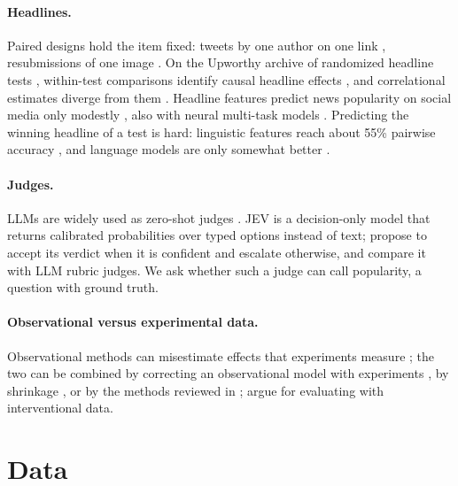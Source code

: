 \documentclass[10pt,a4paper,twocolumn]{article}
\begin{document}
\paragraph{Headlines.} Paired designs hold the item fixed: tweets by one author on one link \citep{tan2014},
resubmissions of one image \citep{lakkaraju2013}. On the Upworthy archive of randomized headline tests
\citep{matias2021}, within-test comparisons identify causal headline effects
\citep{gligoric2023,banerjee2025,robertson2023}, and correlational estimates diverge from them
\citep{banerjee2026}. Headline features predict news popularity on social media only modestly \citep{piotrkowicz2017},
also with neural multi-task models \citep{lamprinidis2018}. Predicting the winning headline of a test is hard:
linguistic features reach about 55\% pairwise
accuracy \citep{gligoric2021}, and language models are only somewhat better \citep{ye2024lola}.
\paragraph{Judges.} LLMs are widely used as zero-shot judges \citep{zheng2023judge}. JEV is a decision-only
model that returns calibrated probabilities over typed options instead of text; \citet{li2026jev} propose to
accept its verdict when it is confident and escalate otherwise, and \citet{rao2026jev} compare it with LLM
rubric judges. We ask whether such a judge can call popularity, a question with ground truth.
\paragraph{Observational versus experimental data.} Observational methods can misestimate effects that
experiments measure \citep{lalonde1986,gordon2019}; the two can be combined by correcting an observational
model with experiments \citep{kallus2018}, by shrinkage \citep{rosenman2023}, or by the methods reviewed in
\citep{colnet2024}; \citet{gentzel2019} argue for evaluating with interventional data.

\section{Data}
\label{sec:data}
\end{document}

